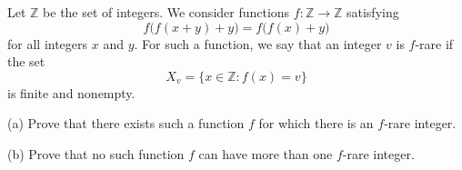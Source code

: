 Let $\mathbb{Z}$ be the set of integers. We consider functions $f\colon \mathbb{Z} \to \mathbb{Z}$ satisfying
\[
f\big(f(x+y)+y\big) = f\big(f(x)+y\big)
\]
for all integers $x$ and $y$. For such a function, we say that an integer $v$ is $f$-rare if the set
\[
X_v = \{x \in \mathbb{Z}\colon f(x) = v\}
\]
is finite and nonempty.

(a) Prove that there exists such a function $f$ for which there is an $f$-rare integer.

(b) Prove that no such function $f$ can have more than one $f$-rare integer.
